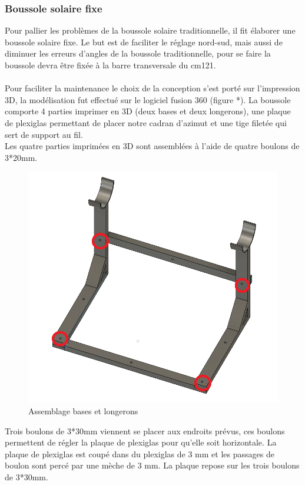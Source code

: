 \documentclass[12pt,a4paper]{article}
\begin{document}
\begin{flushleft}
\subsubsection{Boussole solaire fixe}   

Pour pallier les problèmes de la boussole solaire traditionnelle, il fit élaborer une boussole solaire fixe. Le but est de faciliter le réglage nord-sud, mais aussi de diminuer les erreurs d'angles de la boussole traditionnelle, pour se faire la boussole devra être fixée à la barre transversale du cm121.\\
~\\
Pour faciliter la maintenance le choix de la conception s'est porté sur l'impression 3D, la modélisation fut effectué sur le logiciel fusion 360 (figure *). La boussole comporte 4 parties imprimer en 3D (deux bases et deux longerons), une plaque de plexiglas permettant de placer notre cadran d'azimut et une tige filetée qui sert de support au fil.\\



Les quatre parties imprimées en 3D sont assemblées à l'aide de quatre boulons de 3*20mm.\\

\begin{figure}[H]
\centering
\includegraphics[width=12cm]{image/montage/boussole_solaire/2.png} 
\caption{Assemblage bases et longerons}
\end{figure}

Trois boulons de 3*30mm viennent se placer aux endroits prévus, ces boulons permettent de régler la plaque de plexiglas pour qu'elle soit horizontale. La plaque de plexiglas est coupé dans du plexiglas de 3 mm et les passages de boulon sont percé par une mèche de 3 mm. La plaque repose sur les trois boulons de 3*30mm.\\


\end{flushleft}
\end{document}
